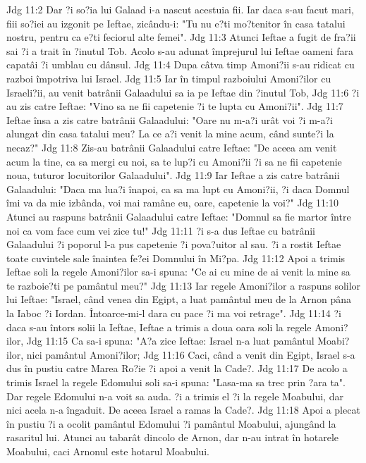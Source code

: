 Jdg 11:2  Dar ?i so?ia lui Galaad i-a nascut acestuia fii. Iar daca s-au facut mari, fiii so?iei au izgonit pe Ieftae, zicându-i: "Tu nu e?ti mo?tenitor în casa tatalui nostru, pentru ca e?ti feciorul alte femei".
Jdg 11:3  Atunci Ieftae a fugit de fra?ii sai ?i a trait în ?inutul Tob. Acolo s-au adunat împrejurul lui Ieftae oameni fara capatâi ?i umblau cu dânsul.
Jdg 11:4  Dupa câtva timp Amoni?ii s-au ridicat cu razboi împotriva lui Israel.
Jdg 11:5  Iar în timpul razboiului Amoni?ilor cu Israeli?ii, au venit batrânii Galaadului sa ia pe Ieftae din ?inutul Tob,
Jdg 11:6  ?i au zis catre Ieftae: "Vino sa ne fii capetenie ?i te lupta cu Amoni?ii".
Jdg 11:7  Ieftae însa a zis catre batrânii Galaadului: "Oare nu m-a?i urât voi ?i m-a?i alungat din casa tatalui meu? La ce a?i venit la mine acum, când sunte?i la necaz?"
Jdg 11:8  Zis-au batrânii Galaadului catre Ieftae: "De aceea am venit acum la tine, ca sa mergi cu noi, sa te lup?i cu Amoni?ii ?i sa ne fii capetenie noua, tuturor locuitorilor Galaadului".
Jdg 11:9  Iar Ieftae a zis catre batrânii Galaadului: "Daca ma lua?i înapoi, ca sa ma lupt cu Amoni?ii, ?i daca Domnul îmi va da mie izbânda, voi mai ramâne eu, oare, capetenie la voi?"
Jdg 11:10  Atunci au raspuns batrânii Galaadului catre Ieftae: "Domnul sa fie martor între noi ca vom face cum vei zice tu!"
Jdg 11:11  ?i s-a dus Ieftae cu batrânii Galaadului ?i poporul l-a pus capetenie ?i pova?uitor al sau. ?i a rostit Ieftae toate cuvintele sale înaintea fe?ei Domnului în Mi?pa.
Jdg 11:12  Apoi a trimis Ieftae soli la regele Amoni?ilor sa-i spuna: "Ce ai cu mine de ai venit la mine sa te razboie?ti pe pamântul meu?"
Jdg 11:13  Iar regele Amoni?ilor a raspuns solilor lui Ieftae: "Israel, când venea din Egipt, a luat pamântul meu de la Arnon pâna la Iaboc ?i Iordan. Întoarce-mi-l dara cu pace ?i ma voi retrage".
Jdg 11:14  ?i daca s-au întors solii la Ieftae, Ieftae a trimis a doua oara soli la regele Amoni?ilor,
Jdg 11:15  Ca sa-i spuna: "A?a zice Ieftae: Israel n-a luat pamântul Moabi?ilor, nici pamântul Amoni?ilor;
Jdg 11:16  Caci, când a venit din Egipt, Israel s-a dus în pustiu catre Marea Ro?ie ?i apoi a venit la Cade?.
Jdg 11:17  De acolo a trimis Israel la regele Edomului soli sa-i spuna: "Lasa-ma sa trec prin ?ara ta". Dar regele Edomului n-a voit sa auda. ?i a trimis el ?i la regele Moabului, dar nici acela n-a îngaduit. De aceea Israel a ramas la Cade?.
Jdg 11:18  Apoi a plecat în pustiu ?i a ocolit pamântul Edomului ?i pamântul Moabului, ajungând la rasaritul lui. Atunci au tabarât dincolo de Arnon, dar n-au intrat în hotarele Moabului, caci Arnonul este hotarul Moabului.
